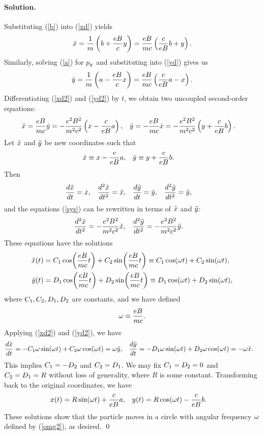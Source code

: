 \documentclass[11pt]{article}
\newcommand{\refeq}[1]{(\ref{#1})}
\newcommand{\beqn}{\begin{equation}}
\newcommand{\eeqn}{\end{equation}}
\newenvironment{solution}
{
    \paragraph{Solution.}
    \ignorespaces
}
{
    \bigskip
}
\begin{document}
\begin{solution}
	Substituting \refeq{b} into \refeq{xd} yields
	\beqn \label{xd2}
		\xd = \frac{1}{m} \left( b + \frac{e B}{c} y \right)
		= \frac{e B}{m c} \left( \frac{c}{e B} b + y \right).
	\eeqn
	Similarly, solving \refeq{a} for $p_y$ and substituting into \refeq{yd} gives us
	\beqn \label{yd2}
		\yd = \frac{1}{m} \left( a - \frac{e B}{c} x \right)
		= \frac{e B}{m c} \left( \frac{c}{e B} a - x \right).
	\eeqn
	Differentiating \refeq{xd2} and \refeq{yd2} by $t$, we obtain two uncoupled second-order equations:
	\begin{align} \label{sys}
		\ddot{x} &= \frac{e B}{m c} \dot{y}
		= -\frac{e^2 B^2}{m^2 c^2} \left( x - \frac{c}{e B} a \right), &
		\ddot{y} &= -\frac{e B}{m c} \dot{x}
		= -\frac{e^2 B^2}{m^2 c^2} \left( y + \frac{c}{e B} b \right).
	\end{align}
	Let $\tilde{x}$ and $\tilde{y}$ be new coordinates such that
	\begin{align*}
		\tilde{x} &\equiv x - \frac{c}{e B} a, &
		\tilde{y} &\equiv y + \frac{c}{e B} b.
	\end{align*}
	Then
	\begin{align*}
		\dv{\tilde{x}}{t} &= \dot{x}, &
		\dv[2]{\tilde{x}}{t} &= \ddot{x}, &
		\dv{\tilde{y}}{t} &= \dot{y}, &
		\dv[2]{\tilde{y}}{t} &= \ddot{y},
	\end{align*}
	and the equations \refeq{sys} can be rewritten in terms of $\tilde{x}$ and $\tilde{y}$:
	\begin{align*}
		\dv[2]{\tilde{x}}{t} &= -\frac{e^2 B^2}{m^2 c^2} \tilde{x}, &
		\dv[2]{\tilde{y}}{t} &= -\frac{e^2 B^2}{m^2 c^2} \tilde{y}.
	\end{align*}
	These equations have the solutions
	\begin{align*}
		\tilde{x}(t) &= C_1 \cos(\frac{e B}{m c} t) + C_2 \sin(\frac{e B}{m c} t)
		\equiv C_1 \cos(\omega t) + C_2 \sin(\omega t), \\
		\tilde{y}(t) &= D_1 \cos(\frac{e B}{m c} t) + D_2 \sin(\frac{e B}{m c} t)
		\equiv D_1 \cos(\omega t) + D_2 \sin(\omega t),
	\end{align*}
	where $C_1, C_2, D_1, D_2$ are constants, and we have defined
	\beqn \label{omg2}
		\omg \equiv \frac{e B}{m c}.
	\eeqn
	Applying \refeq{xd2} and \refeq{yd2}, we have
	\begin{align*}
		\dv{\tilde{x}}{t} &= -C_1 \omega \sin(\omega t) + C_2 \omega \cos(\omega t) = \omega \tilde{y}, &
		\dv{\tilde{y}}{t} &= -D_1 \omega \sin(\omega t) + D_2 \omega \cos(\omega t) = -\omega \tilde{x}.
	\end{align*}
	This implies $C_1 = -D_2$ and $C_2 = D_1$.  We may fix $C_1 = D_2 = 0$ and $C_2 = D_1 = R$ without loss of generality, where $R$ is some constant.
	Transforming back to the original coordinates, we have
	\begin{align*}
		x(t) &= R \sin(\omega t) + \frac{c}{e B} a, &
		y(t) &= R \cos(\omega t) - \frac{c}{e B} b.
	\end{align*}
	These solutions show that the particle moves in a circle with angular frequency $\omega$ defined by \refeq{omg2}, as desired. \qed
\end{solution}
\end{document}
